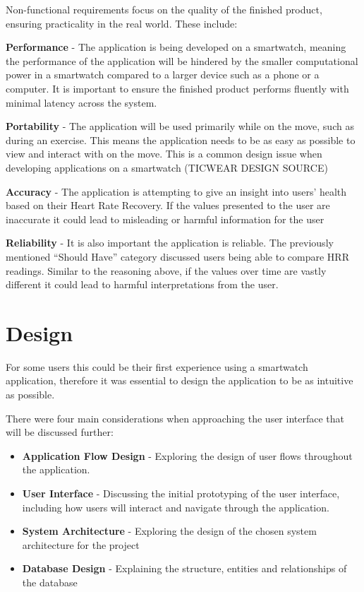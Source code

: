\documentclass{l4proj}
\begin{document}
Non-functional requirements focus on the quality of the finished product, ensuring practicality in the real world. These include:

\textbf{Performance} - The application is being developed on a smartwatch, meaning the performance of the application will be hindered by the smaller computational power in a smartwatch compared to a larger device such as a phone or a computer. It is important to ensure the finished product performs fluently with minimal latency across the system.

\textbf{Portability} -  The application will be used primarily while on the move, such as during an exercise. This means the application needs to be as easy as possible to view and interact with on the move. This is a common design issue when developing applications on a smartwatch (TICWEAR DESIGN SOURCE)

\textbf{Accuracy} - The application is attempting to give an insight into users' health based on their Heart Rate Recovery. If the values presented to the user are inaccurate it could lead to misleading or harmful information for the user

\textbf{Reliability} - It is also important the application is reliable. The previously mentioned “Should Have” category discussed users being able to compare HRR readings. Similar to the reasoning above, if the values over time are vastly different it could lead to harmful interpretations from the user.

\chapter{Design}
\label{sec:design}

For some users this could be their first experience using a smartwatch application, therefore it was essential to design the application to be as intuitive as possible. 

There were four main considerations when approaching the user interface that will be discussed further:

\begin{itemize}
    \item \textbf{Application Flow Design} - Exploring the design of user flows throughout the application.
    \item \textbf{User Interface} - Discussing the initial prototyping of the user interface, including how users will interact and navigate through the application.
    \item \textbf{System Architecture} - Exploring the design of the chosen system architecture for the project
    \item \textbf{Database Design} - Explaining the structure, entities and relationships of the database
\end{itemize}
\end{document}
